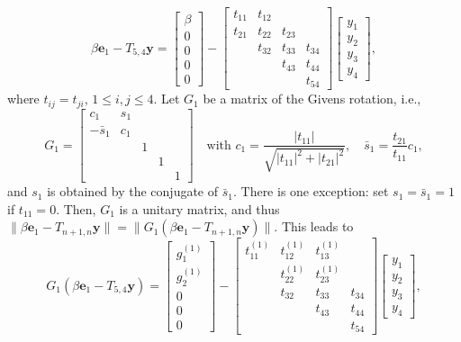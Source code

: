 \[\beta\bm e_1-T_{5,4}\bm y=\begin{bmatrix}\beta\\0\\0\\0\\0\end{bmatrix}
-\begin{bmatrix}t_{11}&t_{12}&&\\t_{21}&t_{22}&t_{23}&\\&t_{32}&t_{33}&t_{34}\\&&t_{43}&t_{44}\\&&&t_{54}\end{bmatrix}\begin{bmatrix}y_1\\y_2\\y_3\\y_4\end{bmatrix},\]
{where $t_{ij}=t_{ji}$, $1\le i,j\le4$. Let $G_1$ be a matrix of the Givens rotation, i.e.,}
\[G_1=\begin{bmatrix}c_1&s_1&&&\\-\bar s_1&c_1&&&\\&&1&&\\&&&1&\\&&&&1\end{bmatrix}
\quad\text{with }c_1=\frac{|t_{11}|}{\sqrt{|t_{11}|^2+|t_{21}|^2}},\quad\bar s_1=\frac{t_{21}}{t_{11}}c_1,\]
{and $s_1$ is obtained by the conjugate of $\bar s_1$. There is one exception: set $s_1=\bar s_1=1$ if $t_{11}=0$. Then, $G_1$ is a unitary matrix, and thus $\|\beta\bm e_1-T_{n+1,n}\bm y\|=\|G_1(\beta\bm e_1-T_{n+1,n}\bm y)\|$. This leads to}
\[G_1(\beta\bm e_1-T_{5,4}\bm y)=\begin{bmatrix}g_1^{(1)}\\g_2^{(1)}\\0\\0\\0\end{bmatrix}
-\begin{bmatrix}t_{11}^{(1)}&t_{12}^{(1)}&t_{13}^{(1)}&\\&t_{22}^{(1)}&t_{23}^{(1)}&\\&t_{32}&t_{33}&t_{34}\\&&t_{43}&t_{44}\\&&&t_{54}\end{bmatrix}\begin{bmatrix}y_1\\y_2\\y_3\\y_4\end{bmatrix},\]
